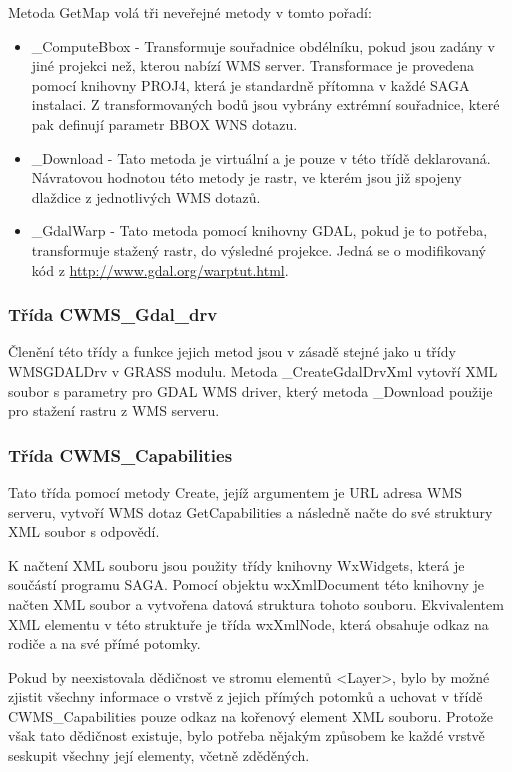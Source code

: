 \documentclass[a4paper,12pt]{article}
\begin{document}
Metoda GetMap volá tři neveřejné metody v tomto pořadí:
\begin{itemize}
 \item \_ComputeBbox - Transformuje souřadnice obdélníku, pokud jsou zadány v jiné projekci než, kterou nabízí WMS server. Transformace je provedena pomocí knihovny PROJ4, která je standardně přítomna v každé SAGA instalaci. Z transformovaných bodů jsou vybrány extrémní souřadnice, které pak definují parametr BBOX WNS dotazu. 
 \item \_Download - Tato metoda je virtuální a je pouze v této třídě deklarovaná. 
 Návratovou hodnotou této metody je rastr, ve kterém jsou již spojeny dlaždice
 z jednotlivých WMS dotazů.
 \item \_GdalWarp - Tato metoda pomocí knihovny GDAL, pokud je to potřeba, transformuje stažený rastr, do výsledné projekce. Jedná se o modifikovaný kód z \url{http://www.gdal.org/warptut.html}.
\end{itemize}

\subsubsection{Třída CWMS\_Gdal\_drv}

Členění této třídy a funkce jejich metod jsou v zásadě stejné jako u třídy WMSGDALDrv v GRASS modulu. Metoda \_CreateGdalDrvXml vytovří XML soubor s parametry pro GDAL WMS driver, 
který metoda  \_Download použije pro stažení rastru z WMS serveru. 


\subsubsection{Třída CWMS\_Capabilities}

Tato  třída pomocí metody Create, jejíž argumentem je URL adresa WMS serveru, vytvoří WMS dotaz GetCapabilities a následně načte do své struktury XML soubor s odpovědí.

K načtení XML souboru jsou použity třídy knihovny WxWidgets, která je součástí programu SAGA. Pomocí objektu wxXmlDocument této knihovny je načten XML soubor a vytvořena datová struktura tohoto souboru. Ekvivalentem XML elementu v této struktuře je třída wxXmlNode, která obsahuje odkaz na rodiče a na své přímé potomky. 

Pokud by neexistovala dědičnost ve stromu elementů <Layer>, bylo by možné zjistit všechny informace o vrstvě z jejich přímých potomků a uchovat v třídě CWMS\_Capabilities pouze odkaz na kořenový element XML souboru. Protože však tato dědičnost existuje, bylo potřeba nějakým způsobem ke každé vrstvě seskupit všechny její elementy, včetně zděděných. 
  
\end{document}
